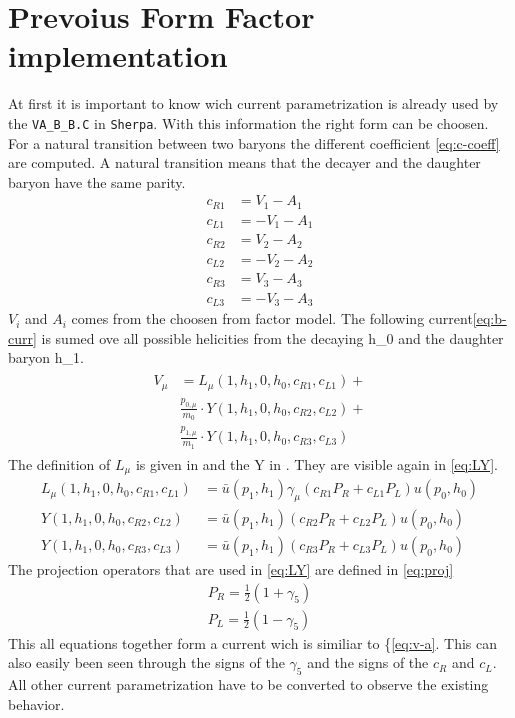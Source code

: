 \section{Prevoius Form Factor implementation}
At first it is important to know wich current parametrization is already used 
by the \texttt{VA\_B\_B.C} in \texttt{Sherpa}. With this information the right 
form can be choosen.
For a natural transition between two baryons the different coefficient
{\eqref{eq:c-coeff}} are computed. A natural transition means that the decayer 
and the daughter baryon have the same parity.
\begin{align}
  c_{R1} & = V_1 - A_1 \nonumber \\
  c_{L1} & = -V_1 - A_1 \nonumber \\
  c_{R2} & = V_2 - A_2 \nonumber \\
  c_{L2} & = -V_2 - A_2 \nonumber \\
  c_{R3} & = V_3 - A_3 \nonumber \\
  c_{L3} & = -V_3 - A_3 \label{eq:c-coeff}
\end{align}
\(V_i\) and \(A_i\) comes from the choosen from factor model. The following 
current{\eqref{eq:b-curr}} is sumed ove all possible helicities from the 
decaying h\_0 and the daughter baryon h\_1.
\begin{align}
\begin{split}
  V_\mu &= L_\mu(1, h_1, 0, h_0, c_{R1}, c_{L1}) + \\
        & \frac{p_{0, \mu}}{m_0} \cdot Y(1, h_1, 0, h_0, c_{R2}, c_{L2}) + \\
        & \frac{p_{1, \mu}}{m_1} \cdot Y(1, h_1, 0, h_0, c_{R3}, c_{L3}) \label{eq:b-curr}
\end{split}
\end{align}
The definition of \(L_\mu\) is given in \cite[Eq. A.96]{diploma} and the Y in 
\cite[Eq. A.94]{diploma}. They are visible again in {\eqref{eq:LY}}.
\begin{align}
  L_\mu(1, h_1, 0, h_0, c_{R1}, c_{L1}) & = \bar{u}(p_1, h_1)\gamma_\mu \left( c_{R1} P_R + c_{L1} P_L \right) u(p_0, h_0) \nonumber \\
  Y(1, h_1, 0, h_0, c_{R2}, c_{L2}) & = \bar{u}(p_1, h_1) \left( c_{R2} P_R + c_{L2} P_L \right) u(p_0, h_0) \nonumber \\
  Y(1, h_1, 0, h_0, c_{R3}, c_{L3}) & = \bar{u}(p_1, h_1) \left( c_{R3} P_R + c_{L3} P_L \right) u(p_0, h_0) \label{eq:LY}
\end{align}
The projection operators that are used in {\eqref{eq:LY}} are defined in {\eqref{eq:proj}}
\begin{align}
  P_R = \frac{1}{2} \left( 1 + \gamma_5 \right) \nonumber \\
  P_L = \frac{1}{2} \left( 1 - \gamma_5 \right) \label{eq:proj}
\end{align}
This all equations together form a current wich is similiar to {\{\eqref{eq:v-a}}.
This can also easily been seen through the signs of the \(\gamma_5\) and the 
signs of the \(c_R\) and \(c_L\).
All other current parametrization have to be converted to observe the 
existing behavior.

